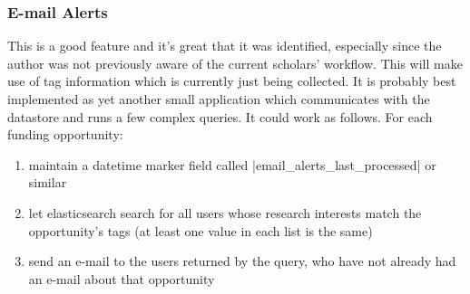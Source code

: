 


\subsubsection{E-mail Alerts}
This is a good feature and it's great that it was identified, especially since the author was not previously aware of the current scholars' workflow. This will make use of tag information which is currently just being collected. It is probably best implemented as yet another small application which communicates with the datastore and runs a few complex queries. It could work as follows. For each funding opportunity:

\begin{enumerate}
\item maintain a datetime marker field called |email_alerts_last_processed| or similar
\item let elasticsearch search for all users whose research interests match the opportunity's tags (at least one value in each list is the same)
\item send an e-mail to the users returned by the query, who have not already had an e-mail about that opportunity
\end{enumerate}


